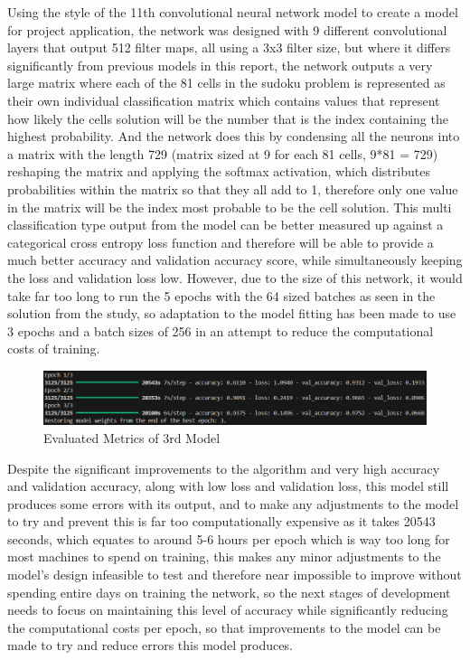 \documentclass[]{final_report}
\begin{document}
Using the style of the 11th convolutional neural network model \cite{JacksonYu2025} to create a model for project application, the network was designed with 9 different convolutional layers that output 512 filter maps, all using a 3x3 filter size, but where it differs significantly from previous models in this report, the network outputs a very large matrix where each of the 81 cells in the sudoku problem is represented as their own individual classification matrix which contains values that represent how likely the cells solution will be the number that is the index containing the highest probability. And the network does this by condensing all the neurons into a matrix with the length 729 (matrix sized at 9 for each 81 cells, 9*81 = 729) reshaping the matrix and applying the softmax activation, which distributes probabilities within the matrix so that they all add to 1, therefore only one value in the matrix will be the index most probable to be the cell solution. This multi classification type output from the model can be better measured up against a categorical cross entropy loss function and therefore will be able to provide a much better accuracy and validation accuracy score, while simultaneously keeping the loss and validation loss low. However, due to the size of this network, it would take far too long to run the 5 epochs with the 64 sized batches as seen in the solution from the study, so adaptation to the model fitting has been made to use 3 epochs and a batch sizes of 256 in an attempt to reduce the computational costs of training.

\clearpage
\begin{figure}[ht]
    \centering 
    \begin{minipage}{1.1\textwidth} 
        \includegraphics[width=\textwidth]{images/3rd model metrics.png} 
        \caption{Evaluated Metrics of 3rd Model} 
        \label{fig: Evaluated Metrics of 3rd Model} 
    \end{minipage} 
    \hfill 
\end{figure}

Despite the significant improvements to the algorithm and very high accuracy and validation accuracy, along with low loss and validation loss, this model still produces some errors with its output, and to make any adjustments to the model to try and prevent this is far too computationally expensive as it takes 20543 seconds, which equates to around 5-6 hours per epoch which is way too long for most machines to spend on training, this makes any minor adjustments to the model’s design infeasible to test and therefore near impossible to improve without spending entire days on training the network, so the next stages of development needs to focus on maintaining this level of accuracy while significantly reducing the computational costs per epoch, so that improvements to the model can be made to try and reduce errors this model produces.
\end{document}
